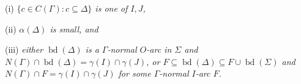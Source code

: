 \hspace*{12pt}(i) \textit{$\{c \in C(\Gamma) \colon c \subseteq \Delta\}$ is one of $I, J$,}

\hspace*{12pt}(ii) \textit{$\alpha(\Delta)$ is small, and}

\hspace*{12pt}(iii) \textit{either $\operatorname{bd}(\Delta)$ is a $\Gamma$-normal $O$-arc in $\Sigma$ and $N(\Gamma) \cap \operatorname{bd}(\Delta) = \gamma(I) \cap \gamma(J)$, or $F \subseteq \operatorname{bd}(\Delta) \subseteq F \cup \operatorname{bd}(\Sigma)$ and $N(\Gamma) \cap F = \gamma(I) \cap \gamma(J)$ for some $\Gamma$-normal $I$-arc $F$.}
